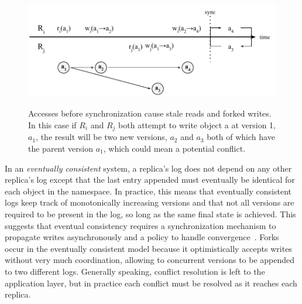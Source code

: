 \begin{figure}
    \begin{center}
        \includegraphics[width=5in]{figures/ch04_forked_writes.pdf}
    \end{center}
    \renewcommand{\baselinestretch}{1}
    \small\normalsize

    \begin{quote}
        \caption[Forked Writes]{Accesses before synchronization cause stale reads and forked writes. In this case if $R_i$ and $R_j$ both attempt to write object a at version 1, $a_1$, the result will be two new versions, $a_2$ and $a_3$ both of which have the parent version $a_1$, which could mean a potential conflict.}
        \label{fig:ch04_forked_writes}
    \end{quote}
\end{figure}
\renewcommand{\baselinestretch}{2}
\small\normalsize


In an \emph{eventually consistent} system, a replica's log does not depend on any other replica's log except that the last entry appended must eventually be identical for each object in the namespace.
In practice, this means that eventually consistent logs keep track of monotonically increasing versions and that not all versions are required to be present in the log, so long as the same final state is achieved.
This suggests that eventual consistency requires a synchronization mechanism to propagate writes asynchronously and a policy to handle convergence~\cite{bayou}.
Forks occur in the eventually consistent model because it optimistically accepts writes without very much coordination, allowing to concurrent versions to be appended to two different logs.
Generally speaking, conflict resolution is left to the application layer, but in practice each conflict must be resolved as it reaches each replica.

